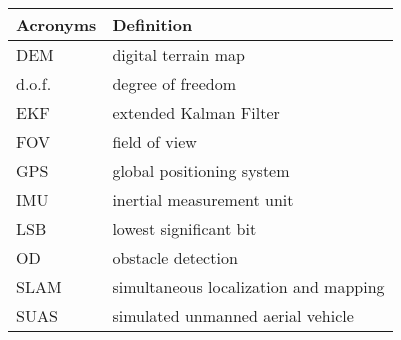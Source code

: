 \begin{center}
\begin{longtable}{ll}
  \hline
  \textbf{Acronyms} & \textbf{Definition} \\
  \hline\hline

DEM     &       digital terrain map\\
d.o.f.  &       degree of freedom \\
EKF     &       extended Kalman Filter \\
FOV	&	field of view	\\
GPS     &       global positioning system \\
IMU     &       inertial measurement unit \\
LSB     &       lowest significant bit  \\
OD      &       obstacle detection \\
SLAM    &       simultaneous localization and mapping \\
SUAS    &       simulated unmanned aerial vehicle \\

  \hline
\end{longtable}
\end{center}
